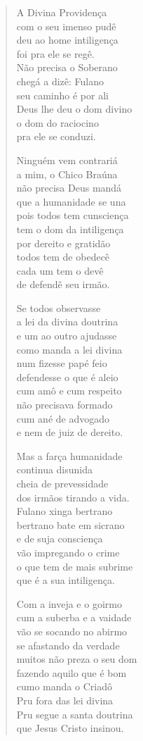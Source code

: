 \begin{verse}
A Divina Providença\\
com o seu imenso pudê\\
deu ao home intiligença\\
foi pra ele se regê.\\
Não precisa o Soberano\\
chegá a dizê: Fulano\\
seu caminho é por ali\\
Deus lhe deu o dom divino\\
o dom do raciocino\\
pra ele se conduzi.

Ninguém vem contrariá\\
a mim, o Chico Braúna\\
não precisa Deus mandá\\
que a humanidade se una\\
pois todos tem cunsciença\\
tem o dom da intiligença\\
por dereito e gratidão\\
todos tem de obedecê\\
cada um tem o devê\\
de defendê seu irmão.

Se todos observasse\\
a lei da divina doutrina\\
e um ao outro ajudasse\\
como manda a lei divina\\
num fizesse papé feio\\
defendesse o que é aleio\\
cum amô e cum respeito\\
não precisava formado\\
cum ané de advogado\\
e nem de juiz de dereito.

Mas a farça humanidade\\
continua disunida\\
cheia de prevessidade\\
dos irmãos tirando a vida.\\
Fulano xinga bertrano\\
bertrano bate em sicrano\\
e de suja consciença\\
vão impregando o crime\\
o que tem de mais subrime\\
que é a sua intiligença.

Com a inveja e o goirmo\\
cum a suberba e a vaidade\\
vão se socando no abirmo\\
se afastando da verdade\\
muitos não preza o seu dom\\
fazendo aquilo que é bom\\
cumo manda o Criadô\\
Pru fora das lei divina\\
Pru segue a santa doutrina\\
que Jesus Cristo insinou.


\end{verse}
